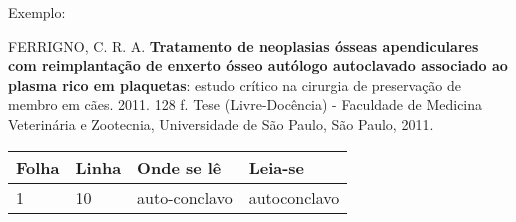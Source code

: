 \begin{errata}
    Exemplo:

    FERRIGNO, C. R. A. \textbf{Tratamento de neoplasias ósseas apendiculares com
    reimplantação de enxerto ósseo autólogo autoclavado associado ao plasma
    rico em plaquetas}: estudo crítico na cirurgia de preservação de membro em
    cães. 2011. 128 f. Tese (Livre-Docência) - Faculdade de Medicina Veterinária e
    Zootecnia, Universidade de São Paulo, São Paulo, 2011.
    
    \begin{table}[htb]
        \center
        \footnotesize
        \begin{tabular}{|p{1.4cm}|p{1cm}|p{3cm}|p{3cm}|}
            \hline
            \textbf{Folha} & \textbf{Linha}  & \textbf{Onde se lê}  & \textbf{Leia-se}\\
            \hline
            1              & 10              & auto-conclavo        & autoconclavo\\
            \hline
        \end{tabular}
    \end{table}
\end{errata}